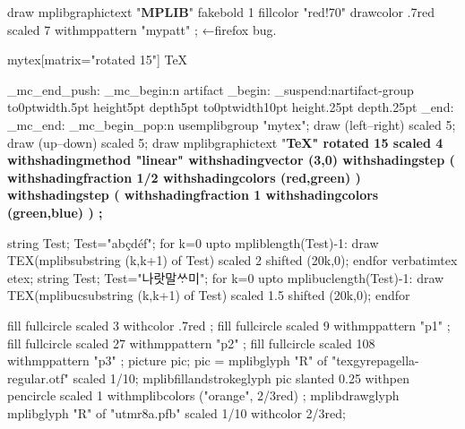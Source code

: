 \documentclass[a4paper]{article}
\begin{document}
\bigskip
\noindent
\mpfig[text]
  draw mplibgraphictext "\textbf{MPLIB}"
    fakebold 1 fillcolor "red!70" drawcolor .7red scaled 7
    withmppattern "mypatt" ;
\endmpfig
←firefox bug.

\leavevmode
\begin{mplibgroup}{mytex}[matrix="rotated 15"] \SuspendTagging{}\TeX \end{mplibgroup}%
  \ExplSyntaxOn
  \tag_mc_end_push:
  \tag_mc_begin:n {artifact}
  \group_begin:
  \tag_suspend:n{artifact-group}
\hbox to0pt{\hss\vrule width.5pt height5pt depth5pt\hss}%
\hbox to0pt{\hss\vrule width10pt height.25pt depth.25pt\hss}%
  \group_end:
  \tag_mc_end:
  \tag_mc_begin_pop:n{}
  \ExplSyntaxOff
{}%
\mpfig[actualtext=TeX] usemplibgroup "mytex"; draw (left--right) scaled 5; draw (up--down) scaled 5; \endmpfig
\mpfig[text]
  draw mplibgraphictext "\bfseries\TeX" rotated 15 scaled 4
    withshadingmethod "linear"
    withshadingvector (3,0)
    withshadingstep (
      withshadingfraction 1/2
      withshadingcolors (red,green)
    )
    withshadingstep (
      withshadingfraction 1
      withshadingcolors (green,blue)
    )
    ;
\endmpfig

\leavevmode
\mpfig[off]
  string Test; Test="abçdéf";
  for k=0 upto mpliblength(Test)-1:
    draw TEX(mplibsubstring (k,k+1) of Test) scaled 2 shifted (20k,0);
  endfor
\endmpfig
\qquad
{}%
\begingroup\ifdefined\tagpdfsetup{}\fi
\mpfig[actualtext=나랏말씀이]
  verbatimtex \hangulfont etex;
  string Test; Test="나랏말ᄊᆞ미";
  for k=0 upto mplibuclength(Test)-1:
    draw TEX(mplibucsubstring (k,k+1) of Test) scaled 1.5 shifted (20k,0);
  endfor
\endmpfig
\endgroup

\mplibforcehmode
{}
  \mpfig[off]
    fill fullcircle scaled 3
    withcolor .7red
    ;
  \endmpfig
\endmppattern
{}
  \mpfig[off]
    fill fullcircle scaled 9
    withmppattern "p1"
    ;
  \endmpfig
\endmppattern
{}
  \mpfig[off]
    fill fullcircle scaled 27
    withmppattern "p2"
    ;
  \endmpfig
\endmppattern
\mpfig[alt=testing nested pattern]
  fill fullcircle scaled 108
  withmppattern "p3"
  ;
\endmpfig
\mpfig
picture pic;
pic = mplibglyph "R" of "texgyrepagella-regular.otf" scaled 1/10;
mplibfillandstrokeglyph pic
  slanted 0.25
  withpen pencircle scaled 1
  withmplibcolors ("orange", 2/3red)
  ;
\endmpfig
\mpfig
  mplibdrawglyph mplibglyph "R" of "utmr8a.pfb" scaled 1/10 withcolor 2/3red;
\endmpfig
\end{document}
